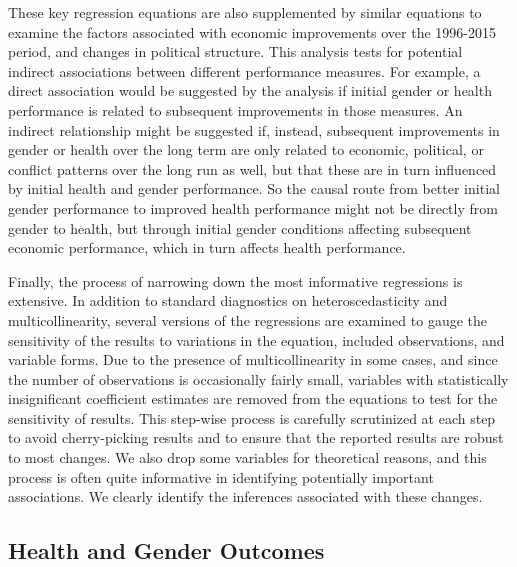 \documentclass[12pt]{article}
\begin{document}
These key regression equations are also supplemented by similar equations to examine the factors associated with economic improvements over the 1996-2015 period, and changes in political structure. This analysis tests for potential indirect associations between different performance measures. For example, a direct association would be suggested by the analysis if initial gender or health performance is related to subsequent improvements in those measures. An indirect relationship might be suggested if, instead, subsequent improvements in gender or health over the long term are only related to economic, political, or conflict patterns over the long run as well, but that these are in turn influenced by initial health and gender performance. So the causal route from better initial gender performance to improved health performance might not be directly from gender to health, but through initial gender conditions affecting subsequent economic performance, which in turn affects health performance.

Finally, the process of narrowing down the most informative regressions is extensive. In addition to standard diagnostics on heteroscedasticity and multicollinearity, several versions of the regressions are examined to gauge the sensitivity of the results to variations in the equation, included observations, and variable forms. Due to the presence of multicollinearity in some cases, and since the number of observations is occasionally fairly small, variables with statistically insignificant coefficient estimates are removed from the equations to test for the sensitivity of results. This step-wise process is carefully scrutinized at each step to avoid cherry-picking results and to ensure that the reported results are robust to most changes. We also drop some variables for theoretical reasons, and this process is often quite informative in identifying potentially important associations. We clearly identify the inferences associated with these changes.

\subsection{Health and Gender Outcomes}

\end{document}
